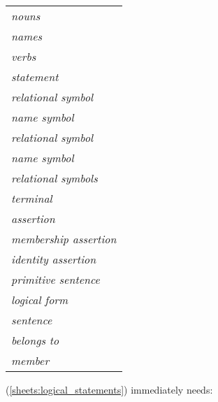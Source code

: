 \begin{tabular}{l}

\textit{nouns}
\\

\textit{names}
\\

\textit{verbs}
\\

\textit{statement}
\\

\textit{relational symbol}
\\

\textit{name symbol}
\\

\textit{relational symbol}
\\

\textit{name symbol}
\\

\textit{relational symbols}
\\

\textit{terminal}
\\

\textit{assertion}
\\

\textit{membership assertion}
\\

\textit{identity assertion}
\\

\textit{primitive sentence}
\\

\textit{logical form}
\\

\textit{sentence}
\\

\textit{belongs to}
\\

\textit{member}
\\

\end{tabular}


\clearpage{}

\newpage
\label{logical_statements}
\label{sheets:logical_statements}
\hypertarget{logical_statements}{}


\clearpage


(\ref{sheets:logical_statements})
immediately needs:

